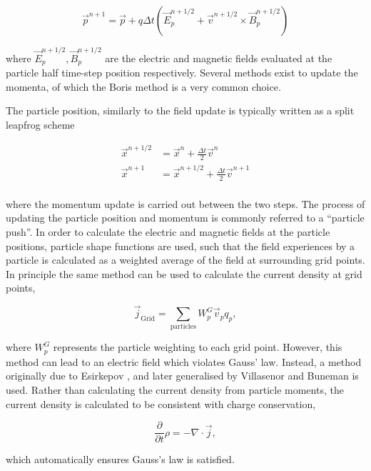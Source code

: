 \documentclass{article}
\begin{document}
\begin{equation}
  \vec{p}^{n+1} = \vec{p} + q \Delta t\left(\vec{E}^{n+1/2}_p + \vec{v}^{n+1/2} \times \vec{B}^{n+1/2}_p\right)
\end{equation}

where $\vec{E}^{n+1/2}_p, \vec{B}^{n+1/2}_p$ are the electric and magnetic fields evaluated at the particle half time-step position respectively. Several methods exist to update the momenta, of which the Boris method \cite{Boris} is a very common choice.

The particle position, similarly to the field update is typically written as a split leapfrog scheme

\begin{align}
  \vec{x}^{n+1/2} &= \vec{x}^n + \frac{\Delta t}{2} \vec{v}^n \\
  \vec{x}^{n+1} &= \vec{x}^{n+1/2} + \frac{\Delta t}{2} \vec{v}^{n+1} \\
\end{align}

where the momentum update is carried out between the two steps. The process of updating the particle position and momentum is commonly referred to a ``particle push''. In order to calculate the electric and magnetic fields at the particle positions, particle shape functions are used, such that the field experiences by a particle is calculated as a weighted average of the field at surrounding grid points. In principle the same method can be used to calculate the current density at grid points,

\begin{equation}
  \vec{j}_{\mathrm{Grid}} = \sum_{\mathrm{particles}} W_p^G \vec{v}_p q_p,
\end{equation}

where $W_p^G$ represents the particle weighting to each grid point. However, this method can lead to an electric field which violates Gauss' law. Instead, a method originally due to Esirkepov \cite{esirkepov}, and later generalised by Villasenor and Buneman \cite{villasenor} is used. Rather than calculating the current density from particle moments, the current density is calculated to be consistent with charge conservation,

\begin{equation}
  \frac{\partial}{\partial t}\rho = - \nabla \cdot \vec{j},
\end{equation}

which automatically ensures Gauss's law is satisfied.
\end{document}
